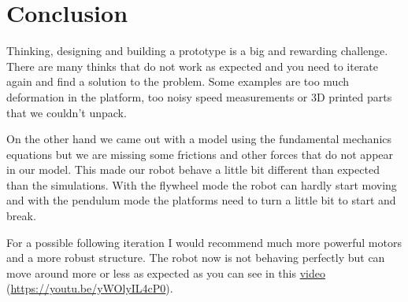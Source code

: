 \section{Conclusion}
Thinking, designing and building a prototype is a big and rewarding challenge.
There are many thinks that do not work as expected and you need to iterate again
and find a solution to the problem. Some examples are too much deformation in the platform,
too noisy speed measurements or 3D printed parts that we couldn't unpack.

On the other hand we came out with a model using the fundamental mechanics equations but we are missing
some frictions and other forces that do not appear in our model. This made our robot behave a little bit
different than expected than the simulations. With the flywheel mode the robot can hardly start moving and with
the pendulum mode the platforms need to turn a little bit to start and break.

For a possible following iteration I would recommend much more powerful motors and a more robust structure.
The robot now is not behaving perfectly but can move around more or less as expected as you can see in this
\href{https://youtu.be/yWOlyIL4cP0}{video} (\href{https://youtu.be/yWOlyIL4cP0}{https://youtu.be/yWOlyIL4cP0}).